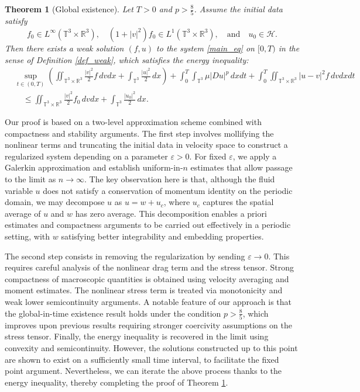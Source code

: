 \documentclass[10pt,reqno]{amsart}
\numberwithin{equation}{section}
\newtheorem{theorem}{Theorem}[section]
\newcommand{\R}{\mathbb R}
\newcommand{\T}{\mathbb T}
\newcommand{\bq}{\begin{equation}}
\newcommand{\eq}{\end{equation}}
\newcommand{\e}{\varepsilon}
\newcommand{\intt}{\int_{\T^3}}
\newcommand{\inttr}{\iint_{\T^3 \times \R^3}}
\begin{document}
\begin{theorem}[Global existence]\label{thm_main}
Let $T > 0$ and $p > \frac85$. Assume the initial data satisfy
\[
f_0 \in L^\infty(\T^3 \times \R^3), \quad (1+|v|^2)f_0 \in L^1(\T^3 \times \R^3), \quad \mbox{and} \quad u_0 \in \mathcal{H}.
\]
Then there exists a weak solution $(f,u)$ to the system \eqref{main_eq} on $[0,T)$ in the sense of Definition \ref{def_weak}, which satisfies the energy inequality:
\bq\label{en_ineq}
\begin{aligned}
&\sup_{t \in (0,T)}\left( \inttr \frac{|v|^2}{2} f\,dvdx + \intt \frac{|u|^2}{2}\,dx \right) + \int_0^T \intt \mu|D u|^p\,dxdt + \int_0^T \inttr |u-v|^2 f\,dvdxdt \\
&\quad \le \inttr \frac{|v|^2}{2} f_0\,dvdx + \intt \frac{|u_0|^2}{2}\,dx.
\end{aligned}
\eq
\end{theorem}
Our proof is based on a two-level approximation scheme combined with compactness and stability arguments. The first step involves mollifying the nonlinear terms and truncating the initial data in velocity space to construct a regularized system depending on a parameter $\e > 0$. For fixed $\e$, we apply a Galerkin approximation and establish uniform-in-$n$ estimates that allow passage to the limit as $n \to \infty$. The key observation here is that, although the fluid variable $u$ does not satisfy a conservation of momentum identity on the periodic domain, we may decompose $u$ as $u = w + u_c$, where $u_c$ captures the spatial average of $u$ and $w$ has zero average. This decomposition enables a priori estimates and compactness arguments to be carried out effectively in a periodic setting, with $w$ satisfying better integrability and embedding properties.

The second step consists in removing the regularization by sending $\e \to 0$. This requires careful analysis of the nonlinear drag term and the stress tensor. Strong compactness of macroscopic quantities is obtained using velocity averaging and moment estimates. The nonlinear stress term is treated via monotonicity and weak lower semicontinuity arguments. A notable feature of our approach is that the global-in-time existence result holds under the condition $p > \frac85$, which improves upon previous results requiring stronger coercivity assumptions on the stress tensor. Finally, the energy inequality is recovered in the limit using convexity and semicontinuity. However, the solutions constructed up to this point are shown to exist on a sufficiently small time interval, to facilitate the fixed point argument. Nevertheless, we can iterate the above process thanks to the energy inequality, thereby completing the proof of Theorem \ref{thm_main}.
\end{document}
